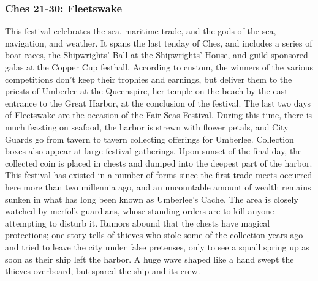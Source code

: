 \documentclass[10pt,a4paper,twoside,twocolumn,openany,nodeprecatedcode]{dndbook}
\begin{document}
\subsubsection{Ches 21-30: Fleetswake}
This festival celebrates the sea, maritime trade, and the gods of the sea, navigation, and weather. It spans the last tenday of Ches, and includes a series of boat races, the Shipwrights' Ball at the Shipwrights' House, and guild-sponsored galas at the Copper Cup festhall. According to custom, the winners of the various competitions don't keep their trophies and earnings, but deliver them to the priests of Umberlee at the Queenspire, her temple on the beach by the east entrance to the Great Harbor, at the conclusion of the festival.
The last two days of Fleetswake are the occasion of the Fair Seas Festival. During this time, there is much feasting on seafood, the harbor is strewn with flower petals, and City Guards go from tavern to tavern collecting offerings for Umberlee. Collection boxes also appear at large festival gatherings. Upon sunset of the final day, the collected coin is placed in chests and dumped into the deepest part of the harbor.
This festival has existed in a number of forms since the first trade-meets occurred here more than two millennia ago, and an uncountable amount of wealth remains sunken in what has long been known as Umberlee's Cache. The area is closely watched by merfolk guardians, whose standing orders are to kill anyone attempting to disturb it. Rumors abound that the chests have magical protections; one story tells of thieves who stole some of the collection years ago and tried to leave the city under false pretenses, only to see a squall spring up as soon as their ship left the harbor. A huge wave shaped like a hand swept the thieves overboard, but spared the ship and its crew.
\end{document}
